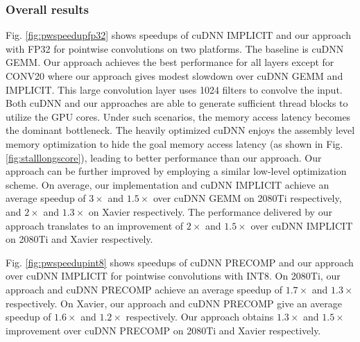 
\subsubsection{Overall results}
  Fig. \ref{fig:pwspeedupfp32} shows speedups of cuDNN IMPLICIT and our approach with FP32  for pointwise
convolutions on two platforms. The baseline is cuDNN GEMM. Our approach achieves the best performance for all layers except for CONV20
where our approach gives modest slowdown over cuDNN GEMM and IMPLICIT. This large convolution layer uses 1024 filters to convolve the
input. Both cuDNN and our approaches are able to generate sufficient thread blocks to utilize the GPU cores. Under such scenarios, the
memory access latency becomes the dominant bottleneck. The heavily optimized cuDNN enjoys the assembly level memory optimization to hide the
goal memory access latency (as shown in Fig. \ref{fig:stalllongscore}), leading to better performance than our approach. Our approach can
be further improved by employing a similar low-level optimization scheme. On average, our implementation and cuDNN IMPLICIT achieve an
average speedup of $3\times$ and $1.5\times$ over cuDNN GEMM on 2080Ti respectively, and $2\times$ and $1.3\times$ on Xavier respectively.
The performance delivered by our approach translates to an improvement of $2\times$ and $1.5\times$ over cuDNN IMPLICIT on 2080Ti and
Xavier respectively.

  Fig. \ref{fig:pwspeedupint8} shows speedups of cuDNN PRECOMP and our approach over cuDNN IMPLICIT for
pointwise convolutions with INT8. On 2080Ti, our approach and cuDNN PRECOMP achieve an average speedup of $1.7\times$ and $1.3\times$
respectively. On Xavier, our approach and cuDNN PRECOMP give an average speedup of $1.6\times$ and $1.2\times$ respectively. Our approach
obtains $1.3\times$ and $1.5\times$ improvement over cuDNN PRECOMP on 2080Ti and Xavier respectively.


